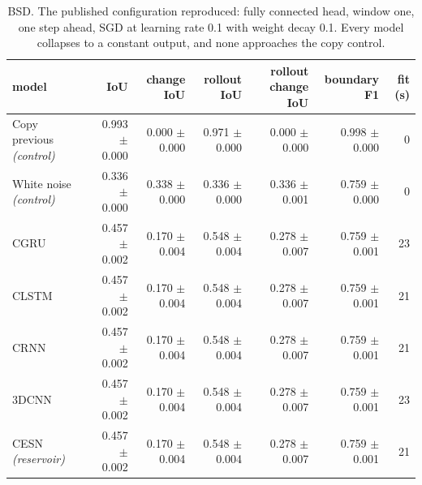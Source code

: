 \begin{table}[t]
\centering\small
\begin{tabular}{lrrrrrr}
\toprule
model & IoU & change IoU & rollout IoU & rollout change IoU & boundary F1 & fit (s) \\
\midrule
Copy previous \emph{(control)} & 0.993 {\scriptsize$\pm$ 0.000} & 0.000 {\scriptsize$\pm$ 0.000} & 0.971 {\scriptsize$\pm$ 0.000} & 0.000 {\scriptsize$\pm$ 0.000} & 0.998 {\scriptsize$\pm$ 0.000} & 0 \\
White noise \emph{(control)} & 0.336 {\scriptsize$\pm$ 0.000} & 0.338 {\scriptsize$\pm$ 0.000} & 0.336 {\scriptsize$\pm$ 0.000} & 0.336 {\scriptsize$\pm$ 0.001} & 0.759 {\scriptsize$\pm$ 0.000} & 0 \\
CGRU & 0.457 {\scriptsize$\pm$ 0.002} & 0.170 {\scriptsize$\pm$ 0.004} & 0.548 {\scriptsize$\pm$ 0.004} & 0.278 {\scriptsize$\pm$ 0.007} & 0.759 {\scriptsize$\pm$ 0.001} & 23 \\
CLSTM & 0.457 {\scriptsize$\pm$ 0.002} & 0.170 {\scriptsize$\pm$ 0.004} & 0.548 {\scriptsize$\pm$ 0.004} & 0.278 {\scriptsize$\pm$ 0.007} & 0.759 {\scriptsize$\pm$ 0.001} & 21 \\
CRNN & 0.457 {\scriptsize$\pm$ 0.002} & 0.170 {\scriptsize$\pm$ 0.004} & 0.548 {\scriptsize$\pm$ 0.004} & 0.278 {\scriptsize$\pm$ 0.007} & 0.759 {\scriptsize$\pm$ 0.001} & 21 \\
3DCNN & 0.457 {\scriptsize$\pm$ 0.002} & 0.170 {\scriptsize$\pm$ 0.004} & 0.548 {\scriptsize$\pm$ 0.004} & 0.278 {\scriptsize$\pm$ 0.007} & 0.759 {\scriptsize$\pm$ 0.001} & 23 \\
CESN \emph{(reservoir)} & 0.457 {\scriptsize$\pm$ 0.002} & 0.170 {\scriptsize$\pm$ 0.004} & 0.548 {\scriptsize$\pm$ 0.004} & 0.278 {\scriptsize$\pm$ 0.007} & 0.759 {\scriptsize$\pm$ 0.001} & 21 \\
\bottomrule
\end{tabular}
\caption{BSD. The published configuration reproduced: fully connected head, window one, one step ahead, SGD at learning rate 0.1 with weight decay 0.1. Every model collapses to a constant output, and none approaches the copy control.}
\label{tab:blockAbsd}
\end{table}

